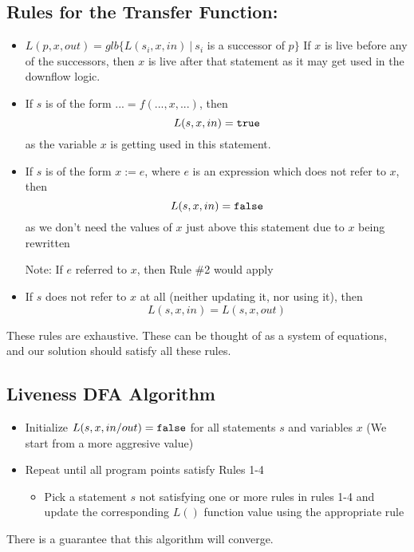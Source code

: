\subsection{Rules for the Transfer Function:}
\begin{itemize}
    \item $L(p, x, out) = glb\{L(s_i, x, in)~|~s_i$ is a successor of $p\}$
    If $x$ is live before any of the successors, then $x$ is live after that statement as it may get used in the downflow logic.
    \item If $s$ is of the form $... = f(...,x,...)$, then $$L(s, x, in) = {\tt true}$$ as the variable $x$ is getting used in this statement.
    \item If $s$ is of the form $x := e$, where $e$ is an expression which does not refer to $x$, then $$L(s, x, in) = {\tt false}$$ as we don't need the values of $x$ just above this statement due to $x$ being rewritten
    
    Note: If $e$ referred to $x$, then Rule \#2 would apply
    \item If $s$ does not refer to $x$ at all (neither updating it, nor using it), then $$L(s, x, in) = L(s, x, out)$$
\end{itemize}

These rules are exhaustive. These can be thought of as a system of equations, and our solution should satisfy all these rules.

\subsection{Liveness DFA Algorithm}
\begin{itemize}
    \item Initialize $L(s, x, in/out) = {\tt false}$ for all statements $s$ and variables $x$ (We start from a more aggresive value)
    \item Repeat until all program points satisfy Rules 1-4
    \begin{itemize}
        \item Pick a statement $s$ not satisfying one or more rules in rules 1-4 and update the corresponding $L()$ function value using the appropriate rule
    \end{itemize}
\end{itemize}

There is a guarantee that this algorithm will converge.